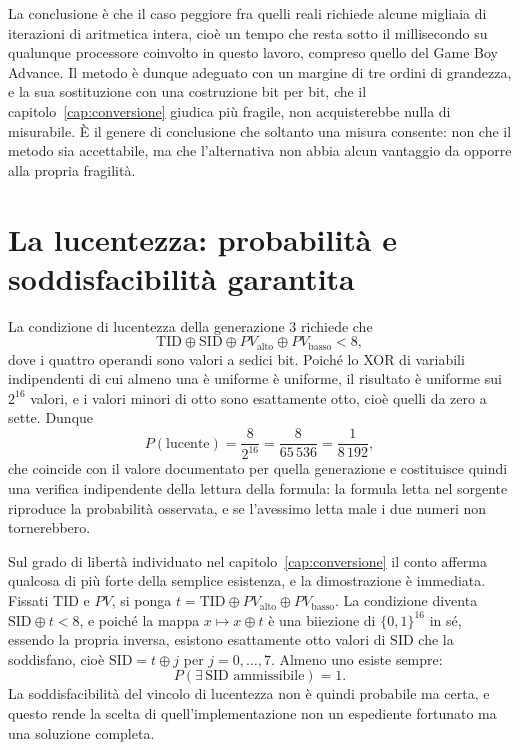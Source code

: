La conclusione è che il caso peggiore fra quelli reali richiede alcune migliaia di iterazioni di aritmetica intera, cioè un tempo che resta sotto il millisecondo su qualunque processore coinvolto in questo lavoro, compreso quello del Game Boy Advance. Il metodo è dunque adeguato con un margine di tre ordini di grandezza, e la sua sostituzione con una costruzione bit per bit, che il capitolo~\ref{cap:conversione} giudica più fragile, non acquisterebbe nulla di misurabile. È il genere di conclusione che soltanto una misura consente: non che il metodo sia accettabile, ma che l'alternativa non abbia alcun vantaggio da opporre alla propria fragilità.

\section{La lucentezza: probabilità e soddisfacibilità garantita}

La condizione di lucentezza della generazione 3 richiede che
\[
\mathrm{TID} \oplus \mathrm{SID} \oplus PV_{\text{alto}} \oplus PV_{\text{basso}} < 8,
\]
dove i quattro operandi sono valori a sedici bit. Poiché lo XOR di variabili indipendenti di cui almeno una è uniforme è uniforme, il risultato è uniforme sui $2^{16}$ valori, e i valori minori di otto sono esattamente otto, cioè quelli da zero a sette. Dunque
\[
P(\text{lucente}) = \frac{8}{2^{16}} = \frac{8}{65\,536} = \frac{1}{8\,192},
\]
che coincide con il valore documentato per quella generazione e costituisce quindi una verifica indipendente della lettura della formula: la formula letta nel sorgente riproduce la probabilità osservata, e se l'avessimo letta male i due numeri non tornerebbero.

Sul grado di libertà individuato nel capitolo~\ref{cap:conversione} il conto afferma qualcosa di più forte della semplice esistenza, e la dimostrazione è immediata. Fissati $\mathrm{TID}$ e $PV$, si ponga $t = \mathrm{TID} \oplus PV_{\text{alto}} \oplus PV_{\text{basso}}$. La condizione diventa $\mathrm{SID} \oplus t < 8$, e poiché la mappa $x \mapsto x \oplus t$ è una biiezione di $\{0,1\}^{16}$ in sé, essendo la propria inversa, esistono esattamente otto valori di $\mathrm{SID}$ che la soddisfano, cioè $\mathrm{SID} = t \oplus j$ per $j = 0, \dots, 7$. Almeno uno esiste sempre:
\[
P(\exists\, \mathrm{SID} \text{ ammissibile}) = 1.
\]
La soddisfacibilità del vincolo di lucentezza non è quindi probabile ma certa, e questo rende la scelta di quell'implementazione non un espediente fortunato ma una soluzione completa.

